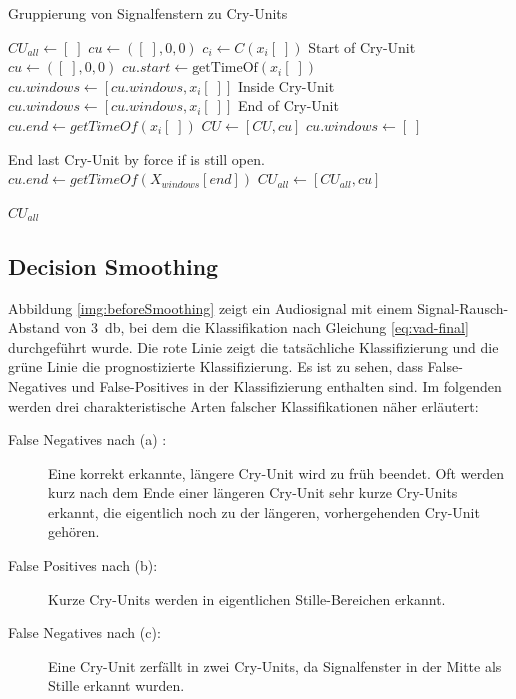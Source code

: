 \begin{algorithm}[h]
	\caption{Gruppierung von Signalfenstern zu Cry-Units}
	\label{alg:cryUnit}
	\begin{algorithmic}[1]
		\State $ CU_{all} \gets [\;]$
		\State $ cu\gets ([\;],0,0)$
				\State $ c_i \gets C(x_i[\;])$
				\State \Comment Start of Cry-Unit
						\State $ cu\gets ([\;],0,0)$
						\State $cu.start \gets \text{getTimeOf}(x_i[\;])$
						\State $cu.windows \gets [cu.windows, x_i[\;]]$
				\EndIf
				\State \Comment Inside Cry-Unit
						\State $cu.windows \gets [cu.windows, x_i[\;]]$
				\EndIf
				\State \Comment End of Cry-Unit
						\State $cu.end \gets  getTimeOf(x_i[\;])$
						\State $CU \gets [CU, cu]$
						\State $cu.windows \gets [\;]$
				\EndIf
		\EndFor
		
		\State \Comment End last Cry-Unit by force if is still open.
		\State $cu.end \gets  getTimeOf(X_{windows}[end])$
		\State $CU_{all} \gets [CU_{all}, cu]$
		\EndIf
		
		\Return $CU_{all}$
		
		\EndFunction
		
	\end{algorithmic}
\end{algorithm}

\subsection{Decision Smoothing}

Abbildung \ref{img:beforeSmoothing} zeigt ein Audiosignal mit einem Signal-Rausch-Abstand von \SI{3}{\decibel}, bei dem die Klassifikation nach Gleichung \ref{eq:vad-final} durchgeführt wurde. Die rote Linie zeigt die tatsächliche Klassifizierung und die grüne Linie die prognostizierte Klassifizierung. Es ist zu sehen, dass False-Negatives und False-Positives in der Klassifizierung enthalten sind. Im folgenden werden drei charakteristische Arten falscher Klassifikationen näher erläutert:

\begin{description}
	\item [False Negatives nach (a) :] Eine korrekt erkannte, längere Cry-Unit wird zu früh beendet. Oft werden kurz nach dem Ende einer längeren Cry-Unit sehr kurze Cry-Units erkannt, die eigentlich noch zu der längeren, vorhergehenden Cry-Unit gehören.
	\item [False Positives nach (b): ] Kurze Cry-Units werden in eigentlichen Stille-Bereichen erkannt.
	\item [False Negatives nach (c): ] Eine Cry-Unit zerfällt in zwei Cry-Units, da Signalfenster in der Mitte als Stille erkannt wurden.
\end{description}

